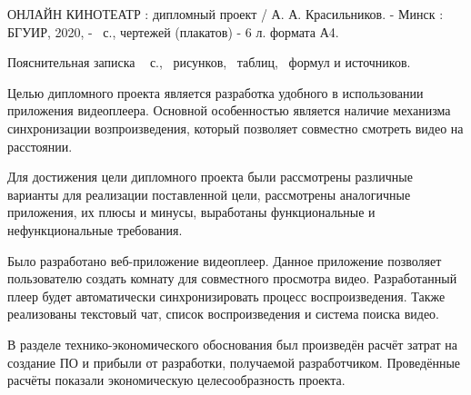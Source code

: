 \thispagestyle{empty}

ОНЛАЙН КИНОТЕАТР : дипломный проект / А. А. Красильников. - Минск : БГУИР, 2020, -~\pageref*{LastPage} с., чертежей (плакатов) - 6 л. формата А4.

Пояснительная записка ~\pageref*{LastPage} с., \totfig{}~рисунков, \tottab{}~таблиц, \toteq{}~формул и \totref{} источников.

Целью дипломного проекта является разработка удобного в использовании приложения видеоплеера.
Основной особенностью является наличие механизма синхронизации возпроизведения, который позволяет совместно смотреть видео на расстоянии.

Для достижения цели дипломного проекта были рассмотрены различные варианты для реализации поставленной цели, рассмотрены аналогичные приложения, их плюсы и минусы, выработаны функциональные и нефункциональные требования.

Было разработано веб-приложение видеоплеер. 
Данное приложение позволяет пользователю создать комнату для совместного просмотра видео.
Разработанный плеер будет автоматически синхронизировать процесс воспроизведения.
Также реализованы текстовый чат, список воспроизведения и система поиска видео.

В разделе технико-экономического обоснования был произведён расчёт затрат на создание ПО и прибыли от разработки, получаемой разработчиком. Проведённые расчёты показали экономическую целесообразность проекта.
\clearpage
